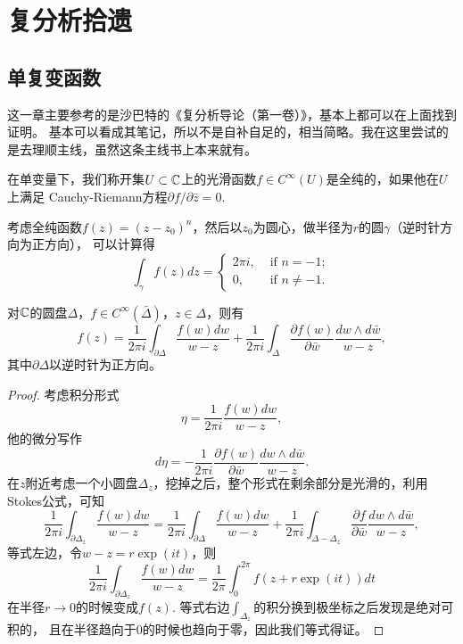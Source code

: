 \chapter{复分析拾遗}

\section{单复变函数}

这一章主要参考的是沙巴特的《复分析导论（第一卷）》，基本上都可以在上面找到证明。
基本可以看成其笔记，所以不是自补自足的，相当简略。我在这里尝试的是去理顺主线，虽然这条主线书上本来就有。

在单变量下，我们称开集$U\subset \mathbb{C}$上的光滑函数$f\in C^\infty(U)$是全纯的，如果他在$U$上满足
Cauchy-Riemann方程$\partial f/\partial \bar z=0$.

\begin{pro}
考虑全纯函数$f(z)=(z-z_0)^n$，然后以$z_0$为圆心，做半径为$r$的圆$\gamma$（逆时针方向为正方向），
可以计算得 
\[
\int_{\gamma}f(z)dz=\begin{cases}
	2\pi i, &\text{ if }n=-1;\\
	0,&\text{ if }n\neq-1.
\end{cases}
\]
\end{pro}

\begin{thm}[Cauchy积分公式]
    对$\mathbb{C}$的圆盘$\Delta$，$f\in C^\infty (\bar\Delta)$，$z\in \Delta$，则有 
    \[
        f(z)=\frac{1}{2 \pi i} \int_{\partial \Delta} \frac{f(w) d w}{w-z}+
        \frac{1}{2 \pi i} \int_{\Delta} \frac{\partial f(w)}{\partial \bar{w}} 
        \frac{d w \wedge d \bar{w}}{w-z},
    \]
    其中$\partial \Delta$以逆时针为正方向。
\end{thm}

\begin{proof}
考虑积分形式
\[
    \eta=\frac{1}{2 \pi i} \frac{f(w) d w}{w-z},
\]
他的微分写作
\[
    d \eta=-\frac{1}{2 \pi i} \frac{\partial f(w)}{\partial \bar{w}} \frac{d w \wedge d \bar{w}}{w-z}.
\]
在$z$附近考虑一个小圆盘$\Delta_z$，挖掉之后，整个形式在剩余部分是光滑的，利用Stokes公式，可知
\[
    \frac{1}{2 \pi i} \int_{\partial \Delta_{z}} \frac{f(w) d w}{w-z}=  
    \frac{1}{2 \pi i} \int_{\partial \Delta} \frac{f(w) d w}{w-z}
+\frac{1}{2 \pi i} \int_{\Delta-\Delta_{z}} \frac{\partial f}{\partial \bar{w}} 
\frac{d w \wedge d \bar{w}}{w-z},
\]
等式左边，令$w-z=r \exp(it)$，则
\[
    \frac{1}{2 \pi i} \int_{\partial \Delta_{z}} \frac{f(w) d w}{w-z}=\frac{1}{2\pi}\int_0^{2\pi}
    f(z+r\exp(it))dt
\]
在半径$r\to 0$的时候变成$f(z)$. 等式右边$\int_{\Delta_z}$的积分换到极坐标之后发现是绝对可积的，
且在半径趋向于$0$的时候也趋向于零，因此我们等式得证。
\end{proof}

